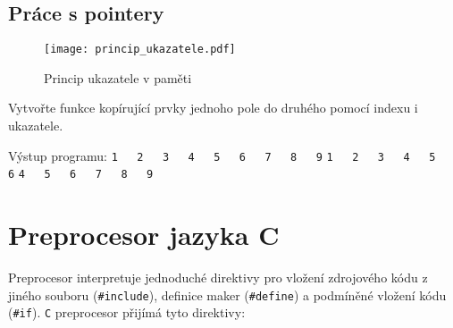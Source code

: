     \subsection{Práce s pointery}
      \begin{figure}
        \centering
        \texttt{[image: princip\_ukazatele.pdf]}
        \caption{Princip ukazatele v paměti}
        \label{figure:pointer1}
      \end{figure}
      \begin{example}Vytvořte funkce kopírující prvky jednoho pole do druhého pomocí indexu i 
      ukazatele.
      
        
        Výstup programu:                                                     \newline
          \lstinline[basicstyle=\ttfamily]!1   2   3   4   5   6   7   8   9!\newline
          \lstinline[basicstyle=\ttfamily]!1   2   3   4   5   6!            \newline
          \lstinline[basicstyle=\ttfamily]!4   5   6   7   8   9!            \newline
      \end{example} 

  \section{Preprocesor jazyka C}
    Preprocesor interpretuje jednoduché direktivy pro vložení zdrojového kódu z jiného souboru 
    (\lstinline[basicstyle=\ttfamily]!#include!), definice maker 
    (\lstinline[basicstyle=\ttfamily]!#define!) a podmíněné vložení kódu 
    (\lstinline[basicstyle=\ttfamily]!#if!). \texttt{C} preprocesor přijímá tyto direktivy:
    
